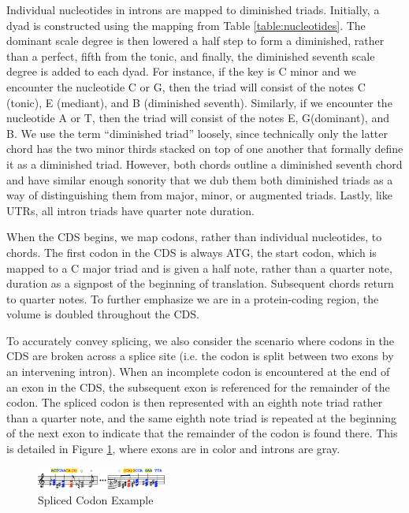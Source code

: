 \documentclass[letterpaper]{article}
\begin{document}
Individual nucleotides in introns are mapped to diminished triads. Initially, a dyad is constructed using the mapping from Table \ref{table:nucleotides}. The dominant scale degree is then lowered a half step to form a diminished, rather than a perfect, fifth from the tonic, and finally, the diminished seventh scale degree is added to each dyad. For instance, if the key is C minor and we encounter the nucleotide C or G, then the triad will consist of the notes C (tonic), E\musFlat\; (mediant), and B\musDoubleFlat\; (diminished seventh). Similarly, if we encounter the nucleotide A or T, then the triad will consist of the notes E\musFlat, G\musFlat (dominant), and B\musDoubleFlat. We use the term “diminished triad” loosely, since technically only the latter chord has the two minor thirds stacked on top of one another that formally define it as a diminished triad. However, both chords outline a diminished seventh chord and have similar enough sonority that we dub them both diminished triads as a way of distinguishing them from major, minor, or augmented triads. Lastly, like UTRs, all intron triads have quarter note duration.

When the CDS begins, we map codons, rather than individual nucleotides, to chords. The first codon in the CDS is always ATG, the start codon, which is mapped to a C major triad and is given a half note, rather than a quarter note, duration as a signpost of the beginning of translation. Subsequent chords return to quarter notes. To further emphasize we are in a protein-coding region, the volume is doubled throughout the CDS.

To accurately convey splicing, we also consider the scenario where codons in the CDS are broken across a splice site (i.e. the codon is split between two exons by an intervening intron). When an incomplete codon is encountered at the end of an exon in the CDS, the subsequent exon is referenced for the remainder of the codon. The spliced codon is then represented with an eighth note triad rather than a quarter note, and the same eighth note triad is repeated at the beginning of the next exon to indicate that the remainder of the codon is found there. This is detailed in Figure \ref{fig:splice_site_example}, where exons are in color and introns are gray. 

\begin{figure}[h!]
\centering
\vspace{-3mm}
\includegraphics[width=0.38\textwidth]{images/splice_site_example}
  \caption{Spliced Codon Example}
  \label{fig:splice_site_example}
  \vspace{-3mm}
\end{figure}
\end{document}
